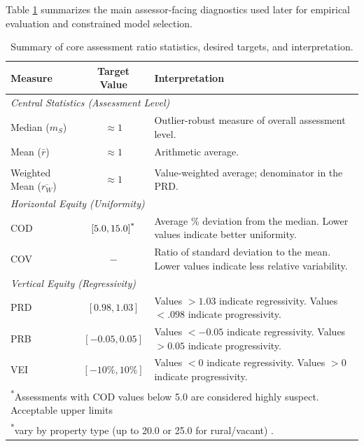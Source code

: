 \documentclass[12pt, draft]{article}
\theoremstyle{plain}
\theoremstyle{definition}
\newcommand{\1}{\mathbf{1}}
\begin{document}
Table \ref{tab:assessment_metrics_summary} summarizes the main assessor-facing diagnostics used later for empirical evaluation and constrained model selection.

\begin{table}[!ht]
\centering
\caption{Summary of core assessment ratio statistics, desired targets, and interpretation.}
\label{tab:assessment_metrics_summary}
\begin{tabular}{lcp{8.5cm}}
\toprule
\textbf{Measure} & \textbf{Target Value} & \textbf{Interpretation} \\
\midrule 
\multicolumn{3}{l}{\textit{Central Statistics (Assessment Level)}} \vspace{3mm} \\
Median ($m_S$) & \(\approx 1\) & Outlier-robust measure of overall assessment level. \\
Mean ($\bar r$) & \(\approx 1\) & Arithmetic average. \\\\
Weighted Mean ($\overline{r_W}$) & \(\approx 1\) & Value-weighted average; denominator in the PRD. \\
\midrule
\multicolumn{3}{l}{\textit{Horizontal Equity (Uniformity)}} \vspace{3mm} \\
COD & \([5.0,15.0]\textsuperscript{*}\) & Average \% deviation from the median. Lower values indicate better uniformity. \\
COV & $-$ & Ratio of standard deviation to the mean. Lower values indicate less relative variability. \\
\midrule
\multicolumn{3}{l}{\textit{Vertical Equity (Regressivity)}} \vspace{3mm} \\
PRD & \([0.98,1.03]\) & Values \(>1.03\) indicate regressivity. Values \(<.098\) indicate progressivity. \\
PRB & \([-0.05,0.05]\) & Values \(<-0.05\) indicate regressivity. Values \(>0.05\) indicate progressivity. \\
VEI & \([-10\%,10\%]\) & Values \(<0\) indicate regressivity. Values \(>0\) indicate progressivity.\\
\bottomrule
\multicolumn{3}{l}{\footnotesize \textsuperscript{*}Assessments with COD values below 5.0 are considered highly suspect. Acceptable upper limits} \\
\multicolumn{3}{l}{\footnotesize {\color{white}\textsuperscript{*}}vary by property type (up to 20.0 or 25.0 for rural/vacant) \cite{IAAO2025ExposureRatio}.}
\end{tabular}
\end{table}
\end{document}
